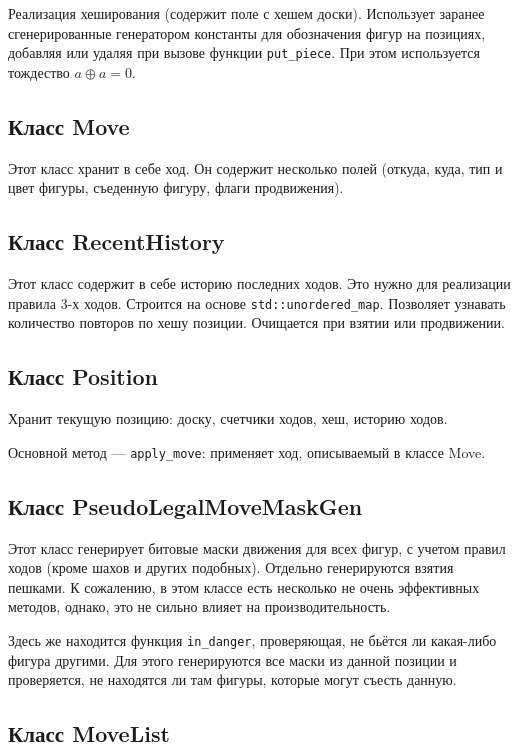 Реализация хеширования (содержит поле с хешем доски). Использует заранее сгенерированные генератором константы для обозначения фигур на позициях, добавляя или удаляя при вызове функции \texttt{put\_piece}. При этом используется тождество $a\oplus a = 0$.

\subsection*{Класс Move}

Этот класс хранит в себе ход. Он содержит несколько полей (откуда, куда, тип и цвет фигуры, съеденную фигуру, флаги продвижения). 

\subsection*{Класс RecentHistory}

Этот класс содержит в себе историю последних ходов. Это нужно для реализации правила 3-х ходов. Строится на основе \texttt{std::unordered\_map}. Позволяет узнавать количество повторов по хешу позиции. Очищается при взятии или продвижении.

\subsection*{Класс Position}

Хранит текущую позицию: доску, счетчики ходов, хеш, историю ходов. 

Основной метод --- \texttt{apply\_move}: применяет ход, описываемый в классе Move.

\subsection*{Класс PseudoLegalMoveMaskGen}

Этот класс генерирует битовые маски движения для всех фигур, с учетом правил ходов (кроме шахов и других подобных). Отдельно генерируются взятия пешками. К сожалению, в этом классе есть несколько не очень эффективных методов, однако, это не сильно влияет на производительность.

Здесь же находится функция \texttt{in\_danger}, проверяющая, не бьётся ли какая-либо фигура другими. Для этого генерируются все маски из данной позиции и проверяется, не находятся ли там фигуры, которые могут съесть данную.

\subsection*{Класс MoveList}

